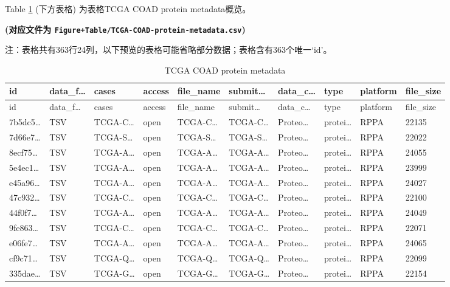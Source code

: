 \documentclass[
]{article}
\begin{document}
Table \ref{tab:TCGA-COAD-protein-metadata} (下方表格) 为表格TCGA COAD protein metadata概览。

\textbf{(对应文件为 \texttt{Figure+Table/TCGA-COAD-protein-metadata.csv})}

\begin{center}\begin{tcolorbox}[colback=gray!10, colframe=gray!50, width=0.9\linewidth, arc=1mm, boxrule=0.5pt]注：表格共有363行24列，以下预览的表格可能省略部分数据；表格含有363个唯一`id'。
\end{tcolorbox}
\end{center}

\begin{longtable}[]{@{}llllllllll@{}}
\caption{\label{tab:TCGA-COAD-protein-metadata}TCGA COAD protein metadata}\tabularnewline
\toprule
id & data\_f\ldots{} & cases & access & file\_name & submit\ldots{} & data\_c\ldots{} & type & platform & file\_size\tabularnewline
\midrule
\endfirsthead
\toprule
id & data\_f\ldots{} & cases & access & file\_name & submit\ldots{} & data\_c\ldots{} & type & platform & file\_size\tabularnewline
\midrule
\endhead
7b5dc5\ldots{} & TSV & TCGA-C\ldots{} & open & TCGA-C\ldots{} & TCGA-C\ldots{} & Proteo\ldots{} & protei\ldots{} & RPPA & 22135\tabularnewline
7d66e7\ldots{} & TSV & TCGA-S\ldots{} & open & TCGA-S\ldots{} & TCGA-S\ldots{} & Proteo\ldots{} & protei\ldots{} & RPPA & 22022\tabularnewline
8ecf75\ldots{} & TSV & TCGA-A\ldots{} & open & TCGA-A\ldots{} & TCGA-A\ldots{} & Proteo\ldots{} & protei\ldots{} & RPPA & 24055\tabularnewline
5e4ec1\ldots{} & TSV & TCGA-A\ldots{} & open & TCGA-A\ldots{} & TCGA-A\ldots{} & Proteo\ldots{} & protei\ldots{} & RPPA & 23999\tabularnewline
e45a96\ldots{} & TSV & TCGA-A\ldots{} & open & TCGA-A\ldots{} & TCGA-A\ldots{} & Proteo\ldots{} & protei\ldots{} & RPPA & 24027\tabularnewline
47c932\ldots{} & TSV & TCGA-C\ldots{} & open & TCGA-C\ldots{} & TCGA-C\ldots{} & Proteo\ldots{} & protei\ldots{} & RPPA & 22100\tabularnewline
44f0f7\ldots{} & TSV & TCGA-A\ldots{} & open & TCGA-A\ldots{} & TCGA-A\ldots{} & Proteo\ldots{} & protei\ldots{} & RPPA & 24049\tabularnewline
9fe863\ldots{} & TSV & TCGA-C\ldots{} & open & TCGA-C\ldots{} & TCGA-C\ldots{} & Proteo\ldots{} & protei\ldots{} & RPPA & 22071\tabularnewline
e06fe7\ldots{} & TSV & TCGA-A\ldots{} & open & TCGA-A\ldots{} & TCGA-A\ldots{} & Proteo\ldots{} & protei\ldots{} & RPPA & 24065\tabularnewline
cf9c71\ldots{} & TSV & TCGA-Q\ldots{} & open & TCGA-Q\ldots{} & TCGA-Q\ldots{} & Proteo\ldots{} & protei\ldots{} & RPPA & 22099\tabularnewline
335dae\ldots{} & TSV & TCGA-G\ldots{} & open & TCGA-G\ldots{} & TCGA-G\ldots{} & Proteo\ldots{} & protei\ldots{} & RPPA & 22154\tabularnewline

\end{longtable}
\end{document}
